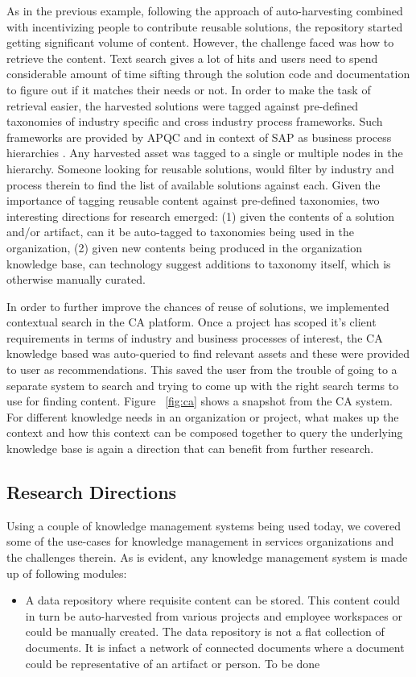 As in the previous example, following the approach of auto-harvesting combined with incentivizing people to contribute reusable solutions, the repository started getting significant volume of content. However, the challenge faced was how to retrieve the content. Text search gives a lot of hits and users need to spend considerable amount of time sifting through the solution code and documentation to figure out if it matches their needs or not. In order to make the task of retrieval easier, the harvested solutions were tagged against pre-defined taxonomies of industry specific and cross industry process frameworks. Such frameworks are provided by APQC \cite{} and in context of SAP as business process hierarchies \cite{}. Any harvested asset was tagged to a single or multiple nodes in the hierarchy. Someone looking for reusable solutions, would filter by industry and process therein to find the list of available solutions against each. Given the importance of tagging reusable content against pre-defined taxonomies, two interesting directions for research emerged: (1) given the contents of a solution and/or artifact, can it be auto-tagged to taxonomies being used in the organization, (2) given new contents being produced in the organization knowledge base, can technology suggest additions to taxonomy itself, which is otherwise manually curated. 

In order to further improve the chances of reuse of solutions, we implemented contextual search in the CA platform. Once a project has scoped it's client requirements in terms of industry and business processes of interest, the CA knowledge based was auto-queried to find relevant assets and these were provided to user as recommendations. This saved the user from the trouble of going to a separate system to search and trying to come up with the right search terms to use for finding content. Figure ~\ref{fig:ca} shows a snapshot from the CA system. 
For different knowledge needs in an organization or project, what makes up the context and how this context can be composed together to query the underlying knowledge base is again a direction that can benefit from further research. 


\subsection{Research Directions}

Using a couple of knowledge management systems being used today, we covered some of the use-cases for knowledge management in services organizations and the challenges therein. As is evident, any knowledge management system is made up of following modules:
\begin{itemize}
\item A data repository where requisite content can be stored. This content could in turn be auto-harvested from various projects and employee workspaces or could be manually created. The data repository is not a flat collection of documents. It is infact a network of connected documents where a document could be representative of an artifact or person.
To be done

\end{itemize}
